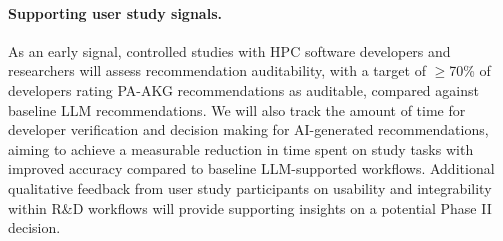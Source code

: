 \paragraph{Supporting user study signals.} As an early signal, controlled studies with HPC software developers and researchers will assess recommendation auditability, with a target of $\geq$70\% of developers rating PA-AKG recommendations as auditable, compared against baseline LLM recommendations. We will also track the amount of time for developer verification and decision making for AI-generated recommendations, aiming to achieve a measurable reduction in time spent on study tasks with improved accuracy compared to baseline LLM-supported workflows. Additional qualitative feedback from user study participants on usability and integrability within R\&D workflows will provide supporting insights on a potential Phase II decision.